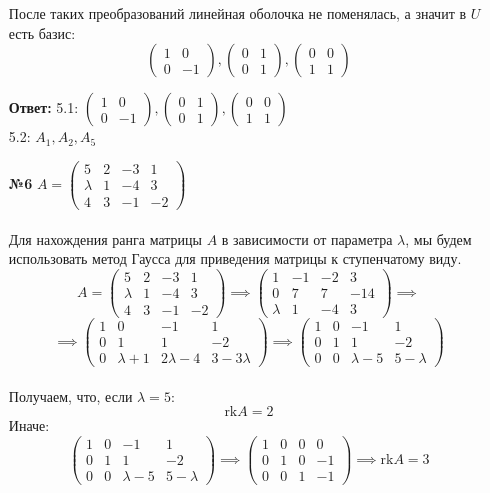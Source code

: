 \documentclass[a4paper]{article}
\newcommand{\mat}[1]{\begin{pmatrix} #1 \end{pmatrix}}
\begin{document}
\begin{enumerate}
    После таких преобразований линейная оболочка не поменялась, а значит в $U$ есть базис:
    $$\mat{1 & 0 \\ 0 & -1}, \mat{0 & 1 \\0 & 1}, \mat{0 & 0 \\ 1 & 1}$$

    \textbf{Ответ: } 5.1:  $\mat{1 & 0 \\ 0 & -1}, \mat{0 & 1 \\0 & 1}, \mat{0 & 0 \\ 1 & 1}$\\
    5.2: $A_1, A_2, A_5$\\
    
    \item[\textbf{№6}]$ A = \begin{pmatrix} 5 & 2 & -3 & 1 \\ \lambda & 1 & -4 & 3 \\ 4 & 3 & -1 & -2 \end{pmatrix} $\\\\
    Для нахождения ранга матрицы $A$ в зависимости от параметра $ \lambda $, мы будем использовать метод Гаусса для приведения матрицы к ступенчатому виду.
    $$
    A = \begin{pmatrix} 5 & 2 & -3 & 1 \\ \lambda & 1 & -4 & 3 \\ 4 & 3 & -1 & -2 \end{pmatrix} \implies \begin{pmatrix}
        1 & -1 & -2 & 3 \\
        0 & 7 & 7 & -14 \\
        \lambda & 1 & -4 & 3
        \end{pmatrix}  \implies 
    $$
    $$    
        \implies\begin{pmatrix}
            1 & 0 & -1 & 1 \\
            0 & 1 & 1 & -2 \\
            0 & \lambda + 1 & 2\lambda - 4 & 3 - 3\lambda
        \end{pmatrix}  \implies
        \begin{pmatrix}
            1 & 0 & -1 & 1 \\
            0 & 1 & 1 & -2 \\
            0 & 0 & \lambda - 5 & 5 - \lambda
            \end{pmatrix}                         
    $$\\
    Получаем, что, если $\lambda = 5$:
    $$\text{rk}A = 2$$
    Иначе:
    $$\begin{pmatrix}
        1 & 0 & -1 & 1 \\
        0 & 1 & 1 & -2 \\
        0 & 0 & \lambda - 5 & 5 - \lambda
        \end{pmatrix} \implies \begin{pmatrix}
            1 & 0 & 0 & 0 \\
            0 & 1 & 0 & -1 \\
            0 & 0 & 1 & -1
            \end{pmatrix}
    \implies \text{rk}A = 3$$


\end{enumerate}
\end{document}
